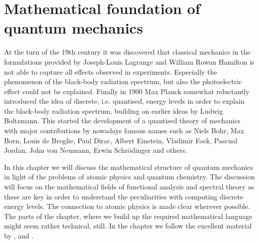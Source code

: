 \chapter{Mathematical foundation of quantum mechanics}


At the turn of the 19th century it was discovered
that classical mechanics in the formulations provided
by Joseph-Louis Lagrange and William Rowan Hamilton
is not able to capture all effects observed in experiments.
Especially the phenomenon of the black-body radiation spectrum,
but also the photoelectric effect could not be explained.
Finally in 1900 Max Planck somewhat reluctantly introduced the idea of discrete,
i.e. quantised, energy levels
in order to explain the black-body radiation spectrum,
building on earlier ideas by Ludwig Boltzmann.
This started the development of a quantised theory of mechanics
with major contributions by nowadays famous names such as
Niels Bohr, Max Born, Louis de Broglie, Paul Dirac, Albert Einstein,
Vladimir Fock, Pascual Jordan, John von Neumann, Erwin Schrödinger
and others.

In this chapter we will discuss the mathematical structure
of quantum mechanics in light of the problems of atomic physics
and quantum chemistry.
The discussion will focus on the mathematical fields of functional
analysis and spectral theory as these are key in order
to understand the peculiarities with computing discrete energy levels.
The connection to atomic physics is made clear wherever possible.
The parts of the chapter, where we build up the required
mathematical language might seem rather technical, still.
In the chapter we follow the excellent material by \citet{Shankar1994},
\citet{Mueller2000} and \citet{Helffer2013}.





